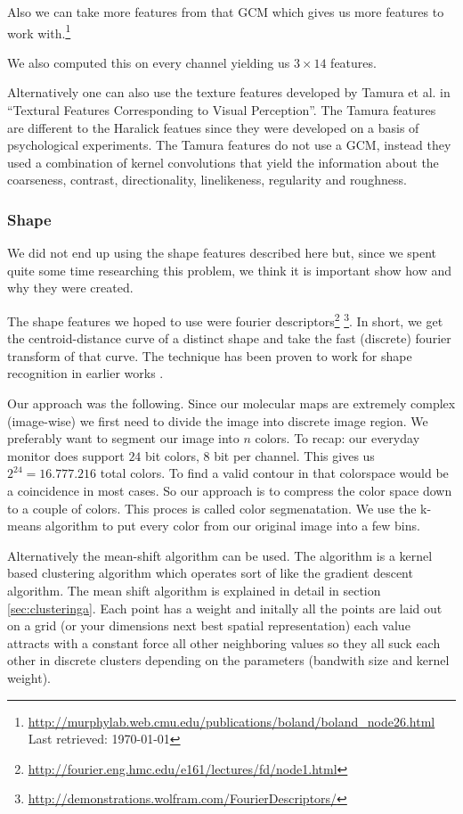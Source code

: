 \documentclass[journal]{vgtc}       %
\begin{document}
Also we can take more features from that GCM which gives us more features to work with.\footnote{\url{http://murphylab.web.cmu.edu/publications/boland/boland_node26.html} \\ Last retrieved: \today}

We also computed this on every channel yielding us \(3 \times 14 \) features.

Alternatively one can also use the  texture features developed by Tamura et al.  in ``Textural Features Corresponding to Visual Perception''\cite{tamura}. The Tamura features are different to the Haralick featues since they were developed on a basis of psychological experiments. The Tamura features do not use a GCM, instead they used a combination of kernel convolutions that yield  the information about the coarseness, contrast, directionality, linelikeness, regularity and roughness.

\subsubsection{Shape}
We did not end up using the shape features described here but, since we spent quite some time researching this problem, we think it is important show how and why they were created.

The shape features we hoped to use were  fourier descriptors\footnote{\url{http://fourier.eng.hmc.edu/e161/lectures/fd/node1.html} } \footnote{\url{http://demonstrations.wolfram.com/FourierDescriptors/}}. In short, we get the centroid-distance curve of a distinct shape and take the fast (discrete) fourier transform of that curve. The technique has been proven to work for shape recognition  in earlier works \cite{fourierd}.  

Our approach was the following.  Since our molecular maps are extremely complex (image-wise) we first need to divide the image into discrete image region.  We preferably want to segment our image into $n$ colors. To recap: our everyday monitor does support \(24\) bit colors, \(8 \) bit per channel. This gives us \(2^{24}=16.777.216 \) total colors.
To find a valid contour in that colorspace would be a coincidence in most cases.
So our approach is to compress the color space down to a couple of colors.
This proces is called color segmenatation. We use the k-means algorithm to put every color from our original image into a few bins.

Alternatively the mean-shift algorithm can be used. The algorithm is a kernel based clustering algorithm which operates sort of like the gradient descent algorithm. The mean shift algorithm is explained in detail in section \ref{sec:clusteringa}.
Each point has a weight and initally all the points are laid out on a grid (or your dimensions next best spatial representation) each value attracts with a constant force all other neighboring values so they all suck each other in discrete clusters depending on the parameters (bandwith size and kernel weight). 
\end{document}

